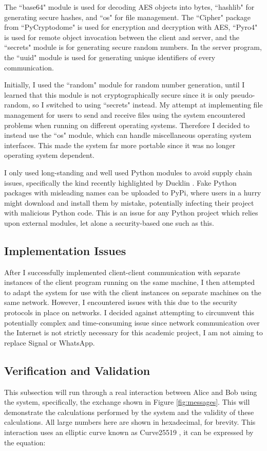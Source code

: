 \documentclass[12pt,a4paper]{article}
\begin{document}
The ``base64" module is used for decoding AES objects into bytes, 
``hashlib" for generating secure hashes, 
and ``os" for file management. 
The ``Cipher" package from ``PyCryptodome" is used for encryption and decryption with AES, 
``Pyro4" is used for remote object invocation between the client and server, 
and the ``secrets" module is for generating secure random numbers. 
In the server program, the ``uuid" module is used for generating unique identifiers of every communication. 

Initially, I used the ``random" module for random number generation, 
until I learned that this module is not cryptographically secure since it is only pseudo-random, so I switched to using ``secrets" instead. 
My attempt at implementing file management for users to send and receive files 
using the system encountered problems when running on different operating systems. 
Therefore I decided to instead use the ``os" module, which can handle miscellaneous operating system interfaces. 
This made the system far more portable since it was no longer operating system dependent. 

I only used long-standing and well used Python modules to avoid supply chain issues, 
specifically the kind recently highlighted by Ducklin \citeyear{ducklin2021python}. 
Fake Python packages with misleading names can be uploaded to PyPi, where users in a hurry might download and install them by mistake, 
potentially infecting their project with malicious Python code. 
This is an issue for any Python project which relies upon external modules, let alone a security-based one such as this. 


\subsection{Implementation Issues} \noindent \label{Implementation}
After I successfully implemented client-client communication with separate instances of the client program running on the same machine, 
I then attempted to adapt the system for use with the client instances on separate machines on the same network. 
However, I encountered issues with this due to the security protocols in place on networks. 
I decided against attempting to circumvent this potentially complex and time-consuming issue 
since network communication over the Internet is not strictly necessary for this academic project, 
I am not aiming to replace Signal or WhatsApp. 


\subsection{Verification and Validation} \noindent \label{Verification}
This subsection will run through a real interaction between Alice and Bob using the system, 
specifically, the exchange shown in Figure \ref{fig:messages}. 
This will demonstrate the calculations performed by the system and the validity of these calculations. 
All large numbers here are shown in hexadecimal, for brevity. 
This interaction uses an elliptic curve known as Curve25519 \cite{10.1007/11745853_14}, 
it can be expressed by the equation: 
\end{document}
